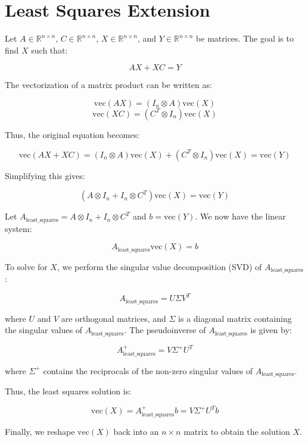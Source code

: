 \documentclass{article}
\begin{document}
\section{Least Squares Extension}


Let \( A \in \mathbb{R}^{n \times n} \), \( C \in \mathbb{R}^{n \times n} \), \( X \in \mathbb{R}^{n \times n} \), and \( Y \in \mathbb{R}^{n \times n} \) be matrices. The goal is to find \( X \) such that:

\[
A X + X C = Y
\]

The vectorization of a matrix product can be written as:

\[
\text{vec}(A X) = (I_n \otimes A) \text{vec}(X)
\]
\[
\text{vec}(X C) = (C^T \otimes I_n) \text{vec}(X)
\]

Thus, the original equation becomes:

\[
\text{vec}(A X + X C) = (I_n \otimes A) \text{vec}(X) + (C^T \otimes I_n) \text{vec}(X) = \text{vec}(Y)
\]

Simplifying this gives:

\[
(A \otimes I_n + I_n \otimes C^T) \text{vec}(X) = \text{vec}(Y)
\]

Let \( A_{\text{least\_squares}} = A \otimes I_n + I_n \otimes C^T \) and \( b = \text{vec}(Y) \). We now have the linear system:

\[
A_{\text{least\_squares}} \text{vec}(X) = b
\]

To solve for \( X \), we perform the singular value decomposition (SVD) of \( A_{\text{least\_squares}} \):

\[
A_{\text{least\_squares}} = U \Sigma V^T
\]

where \( U \) and \( V \) are orthogonal matrices, and \( \Sigma \) is a diagonal matrix containing the singular values of \( A_{\text{least\_squares}} \). The pseudoinverse of \( A_{\text{least\_squares}} \) is given by:

\[
A_{\text{least\_squares}}^+ = V \Sigma^+ U^T
\]

where \( \Sigma^+ \) contains the reciprocals of the non-zero singular values of \( A_{\text{least\_squares}} \).

Thus, the least squares solution is:

\[
\text{vec}(X) = A_{\text{least\_squares}}^+ b = V \Sigma^+ U^T b
\]

Finally, we reshape \( \text{vec}(X) \) back into an \( n \times n \) matrix to obtain the solution \( X \).
\end{document}
